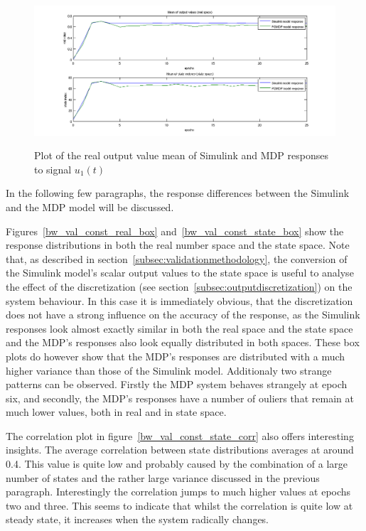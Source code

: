 \begin{figure}
\begin{center}
\includegraphics[width=18cm]{media/bw/bw_val_const_real_mean}\\
\end{center}
\caption{Plot of the real output value mean of Simulink and MDP responses to signal $u_1(t)$}
\label{bw_val_const_real_mean}
\end{figure}

In the following few paragraphs, the response differences between the Simulink and the MDP model will be discussed.

Figures~\ref{bw_val_const_real_box} and~\ref{bw_val_const_state_box} show the response distributions in both the real number space and the state space. Note that, as described in section~\ref{subsec:validationmethodology}, the conversion of the Simulink model's scalar output values to the state space is useful to analyse the effect of the discretization (see section~\ref{subsec:outputdiscretization}) on the system behaviour. In this case it is immediately obvious, that the discretization does not have a strong influence on the accuracy of the response, as the Simulink responses look almost exactly similar in both the real space and the state space and the MDP's responses also look equally distributed in both spaces. These box plots do however show that the MDP's responses are distributed with a much higher variance than those of the Simulink model. Additionaly two strange patterns can be observed. Firstly the MDP system behaves strangely at epoch six, and secondly, the MDP's responses have a number of ouliers that remain at much lower values, both in real and in state space.

The correlation plot in figure~\ref{bw_val_const_state_corr} also offers interesting insights. The average correlation between state distributions averages at around 0.4. This value is quite low and probably caused by the combination of a large number of states and the rather large variance discussed in the previous paragraph. Interestingly the correlation jumps to much higher values at epochs two and three. This seems to indicate that whilst the correlation is quite low at steady state, it increases when the system radically changes.

